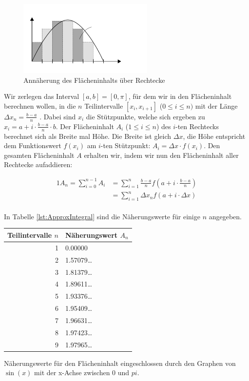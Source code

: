 \begin{figure}
    \centering
    \includegraphics[width=0.6\textwidth]{./svg/integral-univariate-function}
    \caption{Annäherung des Flächeninhalts über Rechtecke}
    \label{fig:ApproxAreaUnivarFun}
\end{figure}

Wir zerlegen das Interval $[a, b] = [0,\pi]$, für dem wir in den Flächeninhalt berechnen wollen, in die $n$ Teilintervalle $[x_i, x_{i+1}]$ ($0\le i \le n)$ mit der Länge $\Delta x_n = \frac{b-a}{n}$ . Dabei sind $x_i$ die Stützpunkte, welche sich ergeben zu $x_i = a + i\cdot\frac{b-a}{n} \cdot b$. Der Flächeninhalt $A_i$ ($1\le i \le n$) des $i$-ten Rechtecks berechnet sich als Breite mal Höhe. Die Breite ist gleich $\Delta x$, die Höhe entspricht dem Funktionswert $f(x_i)$ am $i$-ten Stützpunkt: $A_i = \Delta x \cdot f(x_i)$. Den gesamten Flächeninhalt $A$ erhalten wir, indem wir nun den Flächeninhalt aller Rechtecke aufaddieren:

\begin{alignat*}{1}
  A_n = \sum_{i=0}^{n-1} A_i &= \sum_{i=1}^{n} \frac{b-a}{n} f(a + i\cdot\frac{b-a}{n}) \\
                             &= \sum_{i=1}^{n} \Delta x_n f(a + i\cdot\Delta x) \\
\end{alignat*}

In Tabelle \ref{lst:ApproxIntegral} sind die Näherungswerte für einige $n$ angegeben.

\begin{listing}
    \begin{center}
        \begin{tabular}{ r | l}
            \textbf{Teilintervalle $n$} & \textbf{Näherungswert $A_n$} \\
            \hline
            1 & 0.00000 \\
            2 & 1.57079\dots \\
            3 & 1.81379\dots \\
            4 & 1.89611\dots \\
            5 & 1.93376\dots \\
            6 & 1.95409\dots \\
            7 & 1.96631\dots \\
            8 & 1.97423\dots \\
            9 & 1.97965\dots
        \end{tabular}
    \end{center}
    \caption{Näherungswerte für den Flächeninhalt eingeschlossen durch den Graphen von $\sin(x)$ mit der x-Achse zwischen $0$ und $pi$.}
    \label{lst:ApproxIntegral}
\end{listing}

